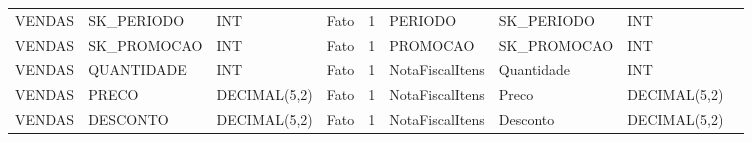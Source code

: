 \begin{landscape}
\begin{longtable}{l|l|l|l|l|l|l|l|l}
{\scriptsize{}VENDAS} & {\scriptsize{}SK\_PERIODO} & {\scriptsize{}INT} & {\scriptsize{}Fato} & {\scriptsize{}1} & {\scriptsize{}PERIODO} & {\scriptsize{}SK\_PERIODO} & {\scriptsize{}INT} & \tabularnewline
{\scriptsize{}VENDAS} & {\scriptsize{}SK\_PROMOCAO} & {\scriptsize{}INT} & {\scriptsize{}Fato} & {\scriptsize{}1} & {\scriptsize{}PROMOCAO} & {\scriptsize{}SK\_PROMOCAO} & {\scriptsize{}INT} & \tabularnewline
{\scriptsize{}VENDAS} & {\scriptsize{}QUANTIDADE} & {\scriptsize{}INT} & {\scriptsize{}Fato} & {\scriptsize{}1} & {\scriptsize{}NotaFiscalItens} & {\scriptsize{}Quantidade} & {\scriptsize{}INT} & \tabularnewline
{\scriptsize{}VENDAS} & {\scriptsize{}PRECO} & {\scriptsize{}DECIMAL(5,2)} & {\scriptsize{}Fato} & {\scriptsize{}1} & {\scriptsize{}NotaFiscalItens} & {\scriptsize{}Preco} & {\scriptsize{}DECIMAL(5,2)} & \tabularnewline
{\scriptsize{}VENDAS} & {\scriptsize{}DESCONTO} & {\scriptsize{}DECIMAL(5,2)} & {\scriptsize{}Fato} & {\scriptsize{}1} & {\scriptsize{}NotaFiscalItens} & {\scriptsize{}Desconto} & {\scriptsize{}DECIMAL(5,2)} & \tabularnewline
\hline 
\end{longtable}
\end{landscape}

